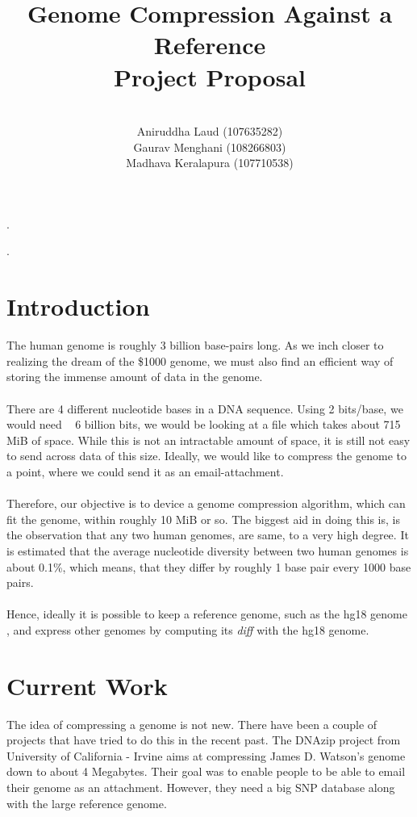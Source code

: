 \documentclass{article}
\title{Genome Compression Against a Reference \\
        Project Proposal \\}
\author{\\
        Aniruddha Laud (107635282)\\
        Gaurav Menghani (108266803)\\
        Madhava Keralapura (107710538)\\}
\begin{document}
\maketitle

\clearpage
.
\clearpage

\tableofcontents

\clearpage
.
\clearpage

\section {Introduction}

The human genome is roughly 3 billion base-pairs long. As we inch closer to realizing the dream of the \$1000 genome, we must also find an efficient way of storing the immense amount of data in the genome.\\
\\
There are 4 different nucleotide bases in a DNA sequence. Using 2 bits/base, we would need ~ 6 billion bits, we would be looking at a file which takes about 715 MiB of space. While this is not an intractable amount of space, it is still not easy to send across data of this size. Ideally, we would like to compress the genome to a point, where we could send it as an email-attachment.\\
\\
Therefore, our objective is to device a genome compression algorithm, which can fit the genome, within roughly 10 MiB or so. The biggest aid in doing this is, is the observation that any two human genomes, are same, to a very high degree. It is estimated that the average nucleotide diversity between two human genomes is about 0.1\%, which means, that they differ by roughly 1 base pair every 1000 base pairs.\cite{jorde04}\\
\\
Hence, ideally it is possible to keep a reference genome, such as the hg18 genome \cite{ucschg18}, and express other genomes by computing its \emph{diff} with the hg18 genome. 
\clearpage

\section {Current Work}
The idea of compressing a genome is not new. There have been a couple of projects that have tried to do this in the recent past. The DNAzip project \cite{dnazip} from University of California - Irvine aims at compressing James D. Watson's genome down to about 4 Megabytes. Their goal was to enable people to be able to email their genome as an attachment. However, they need a big SNP database along with the large reference genome. 
\end{document}

